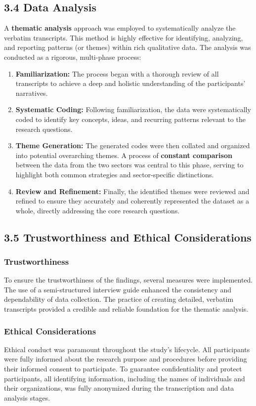 \subsection*{3.4 Data Analysis}

A \textbf{thematic analysis} approach was employed to systematically analyze the verbatim transcripts. This method is highly effective for identifying, analyzing, and reporting patterns (or themes) within rich qualitative data. The analysis was conducted as a rigorous, multi-phase process:
\begin{enumerate}
	\item \textbf{Familiarization:} The process began with a thorough review of all transcripts to achieve a deep and holistic understanding of the participants' narratives.
	\item \textbf{Systematic Coding:} Following familiarization, the data were systematically coded to identify key concepts, ideas, and recurring patterns relevant to the research questions.
	\item \textbf{Theme Generation:} The generated codes were then collated and organized into potential overarching themes. A process of \textbf{constant comparison} between the data from the two sectors was central to this phase, serving to highlight both common strategies and sector-specific distinctions.
	\item \textbf{Review and Refinement:} Finally, the identified themes were reviewed and refined to ensure they accurately and coherently represented the dataset as a whole, directly addressing the core research questions.
\end{enumerate}

\subsection*{3.5 Trustworthiness and Ethical Considerations}

\subsubsection*{Trustworthiness}
To ensure the trustworthiness of the findings, several measures were implemented. The use of a semi-structured interview guide enhanced the consistency and dependability of data collection. The practice of creating detailed, verbatim transcripts provided a credible and reliable foundation for the thematic analysis.

\subsubsection*{Ethical Considerations}
Ethical conduct was paramount throughout the study's lifecycle. All participants were fully informed about the research purpose and procedures before providing their informed consent to participate. To guarantee confidentiality and protect participants, all identifying information, including the names of individuals and their organizations, was fully anonymized during the transcription and data analysis stages.